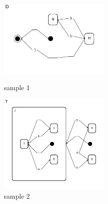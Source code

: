  
\begin{figure}[htbp]
\centering
\begin{minipage}[t]{0.4\textwidth}
\centering
\includegraphics[width=5.5cm]{Bilder/sample3.pdf}
\caption{sample 1}
\end{minipage}
\begin{minipage}[t]{0.4\textwidth}
\centering
\includegraphics[width=5.5cm]{Bilder/sample1.pdf}
\caption{sample 2}
\end{minipage}
\end{figure}


